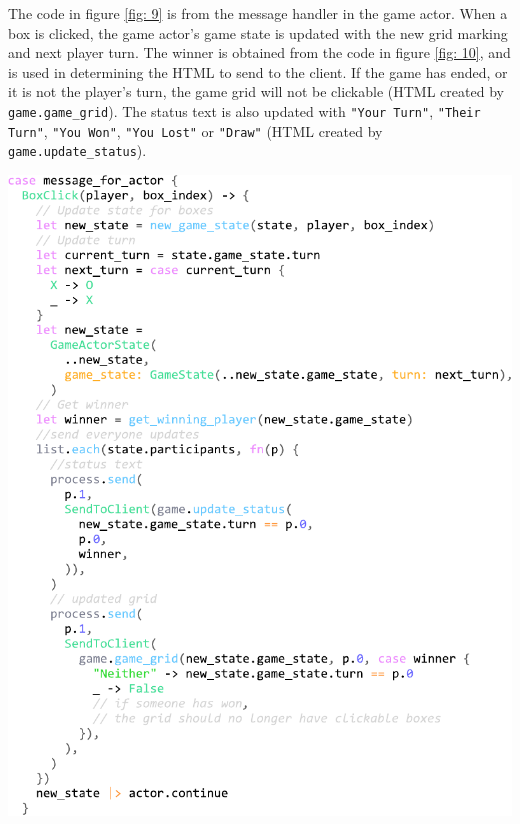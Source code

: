\documentclass[]{final}
\begin{document}
\begin{minipage}[t]{18em}

  The code in figure \ref{fig: 9} is from the message handler in the game actor.
  When a box is clicked, the game actor's game state is updated with the new
  grid marking and next player turn. The winner is obtained from the code in
  figure \ref{fig: 10}, and is used in determining the HTML to send to the client.
  If the game has ended, or it is not the player's turn, the game grid will not be
  clickable (HTML created by \lstinline|game.game_grid|). The status text is also
  updated with \lstinline|"Your Turn"|, \lstinline|"Their Turn"|, \lstinline|"You Won"|,
  \lstinline|"You Lost"| or \lstinline|"Draw"| (HTML created by \lstinline|game.update_status|).

\end{minipage}
\hfill
\begin{minipage}[t]{20em}
  \includegraphics[width=\textwidth]{box_click.pdf}
  \label{fig: 12}
\end{minipage}
\end{document}
